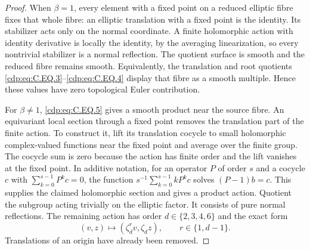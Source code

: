 \begin{proof}
When $\beta=1$, every element with a fixed point
on a reduced elliptic fibre fixes that whole fibre:
an elliptic translation with a fixed point is the
identity. Its stabilizer acts only on the normal
coordinate. A finite holomorphic action with
identity derivative is locally the identity,
by the averaging linearization, so every nontrivial
stabilizer is a normal reflection. The quotient
surface is smooth and the reduced fibre remains
smooth. Equivalently, the translation and root
quotients \eqref{cdp:eq:C.EQ.3}--\eqref{cdp:eq:C.EQ.4} display that fibre
as a smooth multiple. Hence these values have
zero topological Euler contribution.

For $\beta\ne1$, \eqref{cdp:eq:C.EQ.5} gives a smooth product
near the source fibre. An equivariant local section
through a fixed point removes the translation part
of the finite action. To construct it, lift its
translation cocycle to small holomorphic complex-valued
functions near the fixed point and average over the
finite group. The cocycle sum is zero because the
action has finite order and the lift vanishes at
the fixed point. In additive notation, for an operator
$P$ of order $s$ and a cocycle $c$ with
$\sum_{k=0}^{s-1}P^kc=0$, the function
$s^{-1}\sum_{k=0}^{s-1}kP^kc$ solves
$(P-1)b=c$. This supplies the claimed holomorphic
section and gives a product action.
Quotient the subgroup acting trivially on the
elliptic factor. It consists of pure normal
reflections. The remaining action has order
$d\in\{2,3,4,6\}$ and the exact form
\[
             (v,z)\longmapsto(\zeta_d^r v,\zeta_d z),
             \qquad r\in\{1,d-1\}.                   \tag{C.EQ.6}\label{cdp:eq:C.EQ.6}
\]
Translations of an origin have already been removed.


\end{proof}
